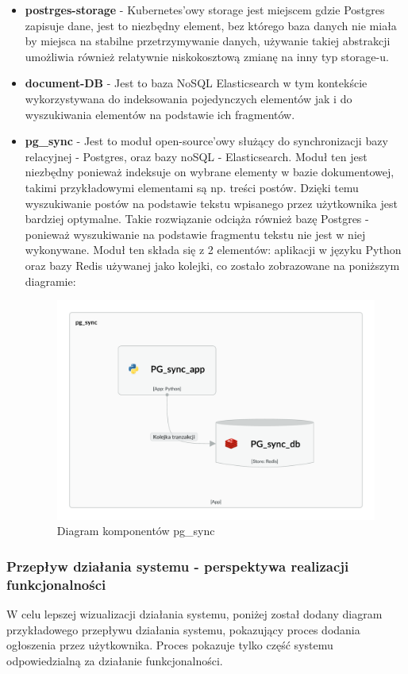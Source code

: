 \begin{itemize}
    \item \textbf{postrges-storage} - Kubernetes'owy storage jest miejscem gdzie Postgres zapisuje dane, jest to niezbędny element, bez którego baza danych nie miała by miejsca na stabilne przetrzymywanie danych, używanie takiej abstrakcji umożliwia również relatywnie niskokosztową zmianę na inny typ storage-u.
    \item \textbf{document-DB} - Jest to baza NoSQL Elasticsearch w tym kontekście wykorzystywana do indeksowania pojedynczych elementów jak i do wyszukiwania elementów na podstawie ich fragmentów.
    \item \textbf{pg\_sync} - Jest to moduł open-source'owy służący do synchronizacji bazy relacyjnej - Postgres, oraz bazy noSQL - Elasticsearch. Moduł ten jest niezbędny ponieważ indeksuje on wybrane elementy w bazie dokumentowej, takimi przykładowymi elementami są np. treści postów. Dzięki temu wyszukiwanie postów na podstawie tekstu wpisanego przez użytkownika jest bardziej optymalne. Takie rozwiązanie odciąża również bazę Postgres - ponieważ wyszukiwanie na podstawie fragmentu tekstu nie jest w niej wykonywane. Moduł ten składa się z 2 elementów: aplikacji w języku Python oraz bazy Redis używanej jako kolejki, co zostało zobrazowane na poniższym diagramie:
    \begin{figure}[H]
        \centering
        \includegraphics[width=0.75\linewidth]{img/pg_sync Component Diagram (Current).png}
        \caption{Diagram komponentów pg\_sync}
        \label{fig:pg_sync}
    \end{figure}
\end{itemize}
\subsubsection{Przepływ działania systemu  - perspektywa realizacji funkcjonalności}
W celu lepszej wizualizacji działania systemu, poniżej został dodany diagram przykładowego przepływu działania systemu, pokazujący proces dodania ogłoszenia przez użytkownika. Proces pokazuje tylko część systemu odpowiedzialną za działanie funkcjonalności.


